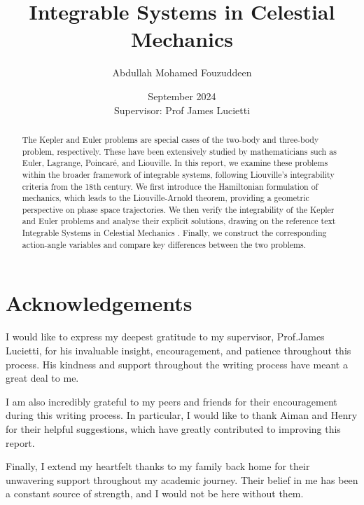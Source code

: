 \documentclass[12pt,oneside]{report}
\title{{Integrable Systems in Celestial Mechanics}}
\date{September 2024 \\[1cm] {\normalsize{Supervisor: Prof James Lucietti}}}
\author{Abdullah Mohamed Fouzuddeen}
\theoremstyle{definition}
\begin{document}
\maketitle

\begin{abstract}
The Kepler and Euler problems are special cases of the two-body and three-body problem, respectively. These have been extensively studied by mathematicians such as Euler, Lagrange, Poincaré, and Liouville. In this report, we examine these problems within the broader framework of integrable systems, following Liouville’s integrability criteria from the 18th century. We first introduce the Hamiltonian formulation of mechanics, which leads to the Liouville-Arnold theorem, providing a geometric perspective on phase space trajectories. We then verify the integrability of the Kepler and Euler problems and analyse their explicit solutions, drawing on the reference text Integrable Systems in Celestial Mechanics \cite{o2008integrable}. Finally, we construct the corresponding action-angle variables and compare key differences between the two problems.
\end{abstract}

\declaration


\chapter*{Acknowledgements}
\thispagestyle{empty}
I would like to express my deepest gratitude to my supervisor, Prof.James Lucietti, for his invaluable insight, encouragement, and patience throughout this process. His kindness and support throughout the writing process have meant a great deal to me.

I am also incredibly grateful to my peers and friends for their encouragement during this writing process. In particular, I would like to thank Aiman and Henry for their helpful suggestions, which have greatly contributed to improving this report.

Finally, I extend my heartfelt thanks to my family back home for their unwavering support throughout my academic journey. Their belief in me has been a constant source of strength, and I would not be here without them.

\clearpage
\end{document}
